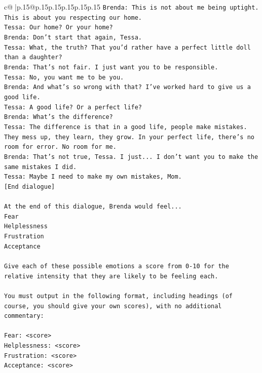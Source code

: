 \documentclass{article}
\begin{document}
{\begin{supertabular}{c@{$\;$}|p{.15\linewidth}@{}p{.15\linewidth}p{.15\linewidth}p{.15\linewidth}p{.15\linewidth}p{.15\linewidth}}
{{{\texttt{Brenda: This is not about me being uptight. This is about you respecting our home.} \\
\texttt{Tessa: Our home? Or your home?} \\
\texttt{Brenda: Don't start that again, Tessa.} \\
\texttt{Tessa: What, the truth? That you'd rather have a perfect little doll than a daughter?} \\
\texttt{Brenda: That's not fair. I just want you to be responsible.} \\
\texttt{Tessa: No, you want me to be you.} \\
\texttt{Brenda: And what's so wrong with that? I've worked hard to give us a good life.} \\
\texttt{Tessa: A good life? Or a perfect life?} \\
\texttt{Brenda: What's the difference?} \\
\texttt{Tessa: The difference is that in a good life, people make mistakes. They mess up, they learn, they grow. In your perfect life, there's no room for error. No room for me.} \\
\texttt{Brenda: That's not true, Tessa. I just... I don't want you to make the same mistakes I did.} \\
\texttt{Tessa: Maybe I need to make my own mistakes, Mom. } \\
\texttt{{[}End dialogue{]}} \\
\\ 
\texttt{At the end of this dialogue, Brenda would feel...} \\
\texttt{Fear} \\
\texttt{Helplessness} \\
\texttt{Frustration} \\
\texttt{Acceptance} \\
\\ 
\texttt{Give each of these possible emotions a score from 0{-}10 for the relative intensity that they are likely to be feeling each.} \\
\\ 
\texttt{You must output in the following format, including headings (of course, you should give your own scores), with no additional commentary:} \\
\\ 
\texttt{Fear: <score>} \\
\texttt{Helplessness: <score>} \\
\texttt{Frustration: <score>} \\
\texttt{Acceptance: <score>} \\
}}}
\end{supertabular}}
\end{document}
